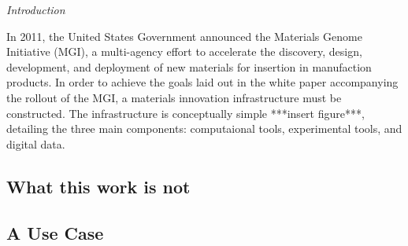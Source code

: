 \textit{Introduction}

In 2011, the United States Government announced the Materials Genome
Initiative (MGI), a multi-agency effort to accelerate the discovery, design,
development, and deployment of new materials for insertion in
manufaction products.    In order to achieve the goals laid out in the white paper
\cite{whitepaper} accompanying the rollout of the MGI, a materials
innovation infrastructure must be constructed.  The infrastructure is
conceptually simple ***insert figure***, detailing the three main
components: computaional tools, experimental tools, and digital data.   

\subsection{What this work is not}


\subsection{A Use Case}

